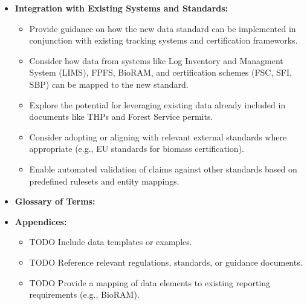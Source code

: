 \documentclass[a4paper, 11pt]{article}
\begin{document}
\begin{itemize}
    \item \textbf{Integration with Existing Systems and Standards:}
        \begin{itemize}
            \item Provide guidance on how the new data standard can be implemented in conjunction with existing tracking systems and certification frameworks.
            \item Consider how data from systems like Log Inventory and Managment System (LIMS), FPFS, BioRAM, and certification schemes (FSC, SFI, SBP) can be mapped to the new standard.
            \item Explore the potential for leveraging existing data already included in documents like THPs and Forest Service permits.
            \item Consider adopting or aligning with relevant external standards where appropriate (e.g., EU standards for biomass certification).
            \item Enable automated validation of claims against other standards based on predefined rulesets and entity mappings.
        \end{itemize}

    \item \textbf{Glossary of Terms:}

    \item \textbf{Appendices:}
        \begin{itemize}
            \item TODO Include data templates or examples.
            \item TODO Reference relevant regulations, standards, or guidance documents.
            \item TODO Provide a mapping of data elements to existing reporting requirements (e.g., BioRAM).
        \end{itemize}

\end{itemize} %
\end{document}
